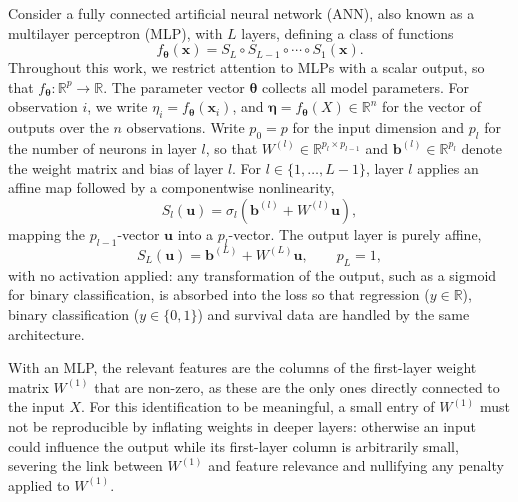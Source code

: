 \documentclass[twoside,11pt]{article}
\newcommand{\bth}{\boldsymbol{\theta}}
\newcommand{\bet}{\boldsymbol{\eta}}
\newcommand{\bx}{\mathbf{x}}
\newcommand{\Wone}{W^{(1)}}
\newcommand{\R}{\mathbb{R}}
\begin{document}
Consider a fully connected artificial neural network (ANN), also known as a multilayer perceptron (MLP), with $L$ layers, defining a class of functions
\begin{equation*}
    f_{\bth}(\bx) = S_L \circ S_{L-1} \circ \cdots \circ S_1(\bx).
\end{equation*}
Throughout this work, we restrict attention to MLPs with a scalar output, so that $f_{\bth}:\R^p\to\R$. The parameter vector $\bth$ collects all model parameters. For observation $i$, we write $\eta_i=f_{\bth}(\bx_i)$, and $\bet=f_{\bth}(X)\in\R^n$ for the vector of outputs over the $n$ observations. Write $p_0 = p$ for the input dimension and $p_l$ for the number of neurons in layer $l$, so that $W^{(l)} \in \R^{p_l \times p_{l-1}}$ and $\mathbf{b}^{(l)} \in \R^{p_l}$ denote the weight matrix and bias of layer $l$. For $l \in \{1, \ldots, L-1\}$, layer $l$ applies an affine map followed by a componentwise nonlinearity,
\begin{equation*}
    S_l(\mathbf{u}) = \sigma_l\!\left(\mathbf{b}^{(l)} + W^{(l)} \mathbf{u}\right),
\end{equation*}
mapping the $p_{l-1}$-vector $\mathbf{u}$ into a $p_l$-vector. The output layer is purely affine,
\begin{equation*}
    S_L(\mathbf{u}) = \mathbf{b}^{(L)} + W^{(L)} \mathbf{u}, \qquad p_L = 1,
\end{equation*}
with no activation applied: any transformation of the output, such as a sigmoid for binary classification, is absorbed into the loss so that regression ($y\in\R$), binary classification ($y\in\{0,1\}$) and survival data are handled by the same architecture.

With an MLP, the relevant features are the columns of the first-layer weight matrix $\Wone$ that are non-zero, as these are the only ones directly connected to the input $X$. For this identification to be meaningful, a small entry of $\Wone$ must not be reproducible by inflating weights in deeper layers: otherwise an input could influence the output while its first-layer column is arbitrarily small, severing the link between $\Wone$ and feature relevance and nullifying any penalty applied to $\Wone$.
\end{document}
